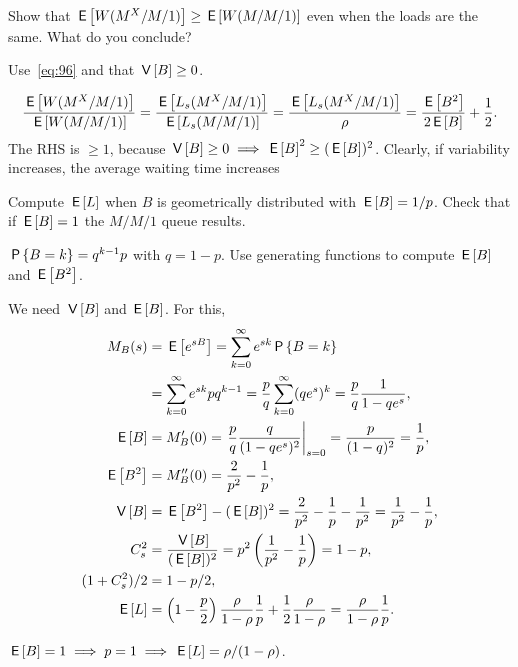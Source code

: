 \begin{exercise}\label{ex:l-172}
 Show
that $\E{\W(M^X/M/1)} \geq \E{\W(M/M/1)}$ even when the loads are the same.
 What do you conclude?
\begin{hint}
Use~\cref{eq:96} and that $\V B \geq 0$.
\end{hint}
\begin{solution}
 \begin{equation*}
 \frac{\E{\W(M^X/M/1)}}{\E{\W(M/M/1)}} = \frac{\E{\Ls(M^X/M/1)}}{\E{\Ls(M/M/1)}} = \frac{\E{\Ls(M^X/M/1)}}{\rho} =
\frac{\E{B^2}}{2\E B} + \frac 12.
 \end{equation*}
 The RHS is $\geq 1$, because $\V B \geq 0 \implies \E B^2 \geq (\E B)^2$.
 Clearly, if variability increases, the average waiting time increases
\end{solution}
\end{exercise}


\begin{exercise}\label{ex:l-168}
Compute $\E\L$ when $B$ is geometrically distributed with $\E B =  1/p$. Check that if $\E B =1$ the $M/M/1$ queue results.
\begin{hint}
$\P{B=k}=q^{k-1}p$ with $q=1-p$. Use generating functions to compute $\E B$ and $\E{B^2}$.
\end{hint}
\begin{solution}
 We need $\V B$ and $\E B$. For this,
 \begin{align*}
 M_B(s)
&= \E{e^{sB}} = \sum_{k=0}^\infty e^{sk} \P{B=k} \\
&= \sum_{k=0}^\infty e^{sk} p q^{k-1}
= \frac p q \sum_{k=0}^\infty (q e^s)^k = \frac p q \frac1{1-qe^s},\\
 \E B &= M_B'(0) = \left.\frac p q \frac q{(1-q e^s)^2}\right|_{s=0}= \frac p{(1-q)^2} = \frac 1 p,\\
 \E{B^2} &= M_B''(0) = \frac2{p^2} - \frac1p, \\
 \V B &= \E{B^2} - (\E B)^2 = \frac2{p^2} - \frac1p - \frac1{p^2} = \frac1{p^2}-\frac1p,\\
 C_s^2&= \frac{\V B}{(\E B)^2} = p^2 \left(\frac1{p^2}-\frac1p\right)=1-p,\\
 (1+C_s^2)/2 &= 1-p/2,\\
 \E \L &=
\left(1-\frac p2\right) \frac\rho{1-\rho} \frac 1 p + \frac12\frac\rho{1-\rho}
=\frac\rho{1-\rho} \frac 1 p.
\end{align*}

$\E B = 1 \implies p = 1 \implies \E\L=\rho/(1-\rho)$.
\end{solution}
\end{exercise}


